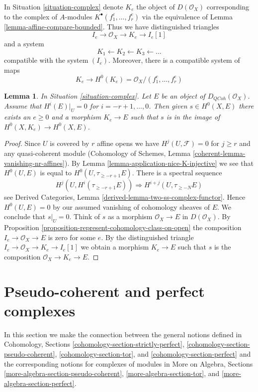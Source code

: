 \documentclass{stacks-project}
\theoremstyle{plain}
\newtheorem{lemma}[subsection]{Lemma}
\theoremstyle{definition}
\theoremstyle{remark}
\numberwithin{equation}{subsection}
\def\QCoh{\mathit{QCoh}}
\begin{document}
\noindent
In Situation \ref{situation-complex} denote $K_e$ the object of
$D(\mathcal{O}_X)$ corresponding to the complex of $A$-modules
$K^\bullet(f_1^e, \ldots, f_r^e)$ via the equivalence of
Lemma \ref{lemma-affine-compare-bounded}. Thus we have distinguished
triangles
$$
I_e \to \mathcal{O}_X \to K_e \to I_e[1]
$$
and a system
$$
K_1 \leftarrow
K_2 \leftarrow
K_3 \leftarrow \ldots
$$
compatible with the system $(I_e)$.
Moreover, there is a compatible system of maps
$$
K_e \to H^0(K_e) = \mathcal{O}_X/(f_1^e, \ldots, f_r^e)
$$

\begin{lemma}
\label{lemma-represent-cohomology-class-on-closed}
In Situation \ref{situation-complex}. Let $E$ be an object of
$D_\QCoh(\mathcal{O}_X)$.
Assume that $H^i(E)|_U = 0$ for $i = - r + 1, \ldots, 0$.
Then given $s \in H^0(X, E)$ there exists an $e \geq 0$ and
a morphism $K_e \to E$ such that $s$ is in the image of
$H^0(X, K_e) \to H^0(X, E)$.
\end{lemma}

\begin{proof}
Since $U$ is covered by $r$ affine opens we have $H^j(U, \mathcal{F}) = 0$
for $j \geq r$ and any quasi-coherent module
(Cohomology of Schemes, Lemma \ref{coherent-lemma-vanishing-nr-affines}).
By Lemma \ref{lemma-application-nice-K-injective} we see that $H^0(U, E)$
is equal to $H^0(U, \tau_{\geq -r + 1}E)$. There is
a spectral sequence
$$
H^j(U, H^i(\tau_{\geq -r + 1}E)) \Rightarrow H^{i + j}(U, \tau_{\geq -N}E)
$$
see Derived Categories, Lemma \ref{derived-lemma-two-ss-complex-functor}.
Hence $H^0(U, E) = 0$ by our assumed vanishing of cohomology sheaves of $E$.
We conclude that $s|_U = 0$.
Think of $s$ as a morphism $\mathcal{O}_X \to E$ in $D(\mathcal{O}_X)$.
By Proposition \ref{proposition-represent-cohomology-class-on-open}
the composition $I_e \to \mathcal{O}_X \to E$ is zero for some $e$.
By the distinguished triangle $I_e \to \mathcal{O}_X \to K_e \to I_e[1]$
we obtain a morphism $K_e \to E$ such that $s$ is the composition
$\mathcal{O}_X \to K_e \to E$.
\end{proof}


\section{Pseudo-coherent and perfect complexes}
\label{section-spell-out}

\noindent
In this section we make the connection between the general
notions defined in
Cohomology, Sections \ref{cohomology-section-strictly-perfect},
\ref{cohomology-section-pseudo-coherent},
\ref{cohomology-section-tor}, and
\ref{cohomology-section-perfect}
and the corresponding notions for complexes of modules in
More on Algebra, Sections
\ref{more-algebra-section-pseudo-coherent},
\ref{more-algebra-section-tor}, and
\ref{more-algebra-section-perfect}.
\end{document}
